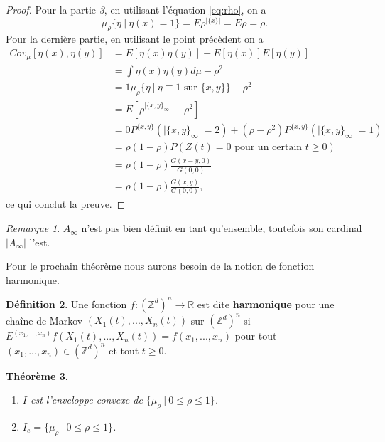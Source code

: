 \documentclass[a4paper,11pt]{article}
\theoremstyle{break}
\theoremstyle{break}
\newtheorem{theorem}{Théorème}[section]
\theoremstyle{definition}
\newtheorem{definition}[theorem]{Définition}
\theoremstyle{remark}
\newtheorem{remarque}[theorem]{Remarque}
\begin{document}
\begin{proof}
Pour la partie \textit{3}, en utilisant l'équation \eqref{eq:rho}, on a
$$
\mu_\rho\{\eta \ \vert \ \eta(x) = 1\}=E\rho^{\vert \{x\} \vert}=E\rho=\rho.
$$
Pour la dernière partie, en utilisant le point précèdent on a
\begin{align*}
Cov_\mu[\eta(x),\eta(y)]&=E[\eta (x) \eta (y)] - E[\eta (x)] E[\eta(y)]\\
&=\int\eta(x)\eta(y)d\mu -\rho^2\\
&=1\mu_\rho\{\eta \ \vert \ \eta\equiv 1 \text{ sur }\{x,y\}\} -\rho^2\\
&=E[\rho^{\vert \{x,y\}_\infty\vert} - \rho^2]\\
&=0P^{\{x,y\}}(\vert\{x,y\}_\infty\vert = 2)+(\rho-\rho^2)P^{\{x,y\}}(\vert\{x,y\}_\infty\vert = 1)\\
&=\rho (1-\rho)P(Z(t)=0 \text{ pour un certain } t\geq 0)\\
&=\rho (1-\rho)\frac{G(x-y,0)}{G(0,0)}\\
&=\rho (1-\rho)\frac{G(x,y)}{G(0,0)},
\end{align*}
ce qui conclut la preuve.
\end{proof}

\begin{remarque}
$A_{\infty}$ n'est pas bien définit en tant qu'ensemble, toutefois son cardinal $\vert A_{\infty}\vert$ l'est.
\end{remarque}

Pour le prochain théorème nous aurons besoin de la notion de fonction harmonique.

\begin{definition}
Une fonction $f : (\mathbb{Z}^d)^n\rightarrow \mathbb{R}$ est dite \textbf{harmonique} pour une chaîne de Markov $(X_1(t),...,X_n(t))$ sur $(\mathbb{Z}^d)^n$ si $E^{(x_1,...,x_n)} f(X_1(t),...,X_n(t)) =f(x_1,...,x_n)$ pour tout $(x_1,...,x_n)\in (\mathbb{Z}^d)^n$ et tout $t\geq 0$.
\end{definition}

\begin{theorem}
\begin{enumerate}
\item $I$ est l'enveloppe convexe de $\{\mu_\rho \ \vert \ 0\leq\rho \leq 1\}$.
\item $I_e=\{\mu_\rho\ \vert \ 0\leq\rho\leq 1\}$.
\end{enumerate}
\end{theorem}
\end{document}
